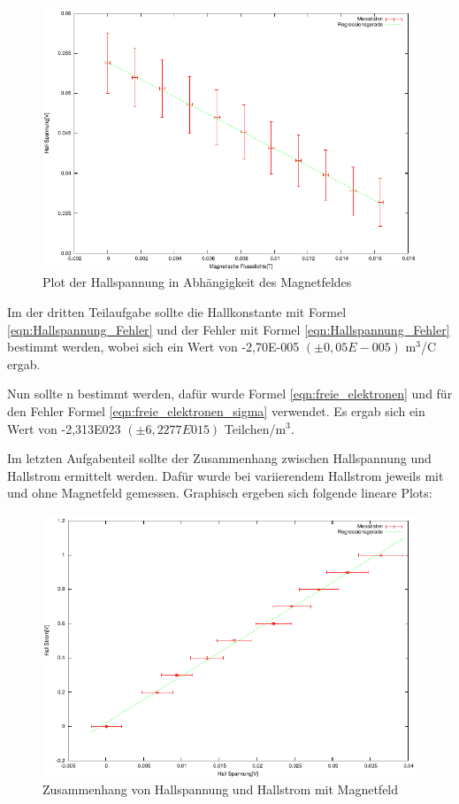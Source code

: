 \documentclass[12pt]{scrartcl}
\begin{document}
\begin{figure}[htbp] 
  \centering
    \includegraphics[scale = 1.3]{aufgabe_3_b.pdf}
  	\caption[Plot der Hallspannung in Abhängigkeit des Magnetfeldes]{Plot der Hallspannung in Abhängigkeit des Magnetfeldes}
  \label{fig:hall_mag}
\end{figure}

Im der dritten Teilaufgabe sollte die Hallkonstante mit Formel \ref{eqn:Hallspannung_Fehler} und der Fehler mit Formel \ref{eqn:Hallspannung_Fehler} bestimmt werden, wobei sich ein Wert von -2,70E-005 $(\pm 0,05E-005)$ m$^3$/C ergab.

Nun sollte n bestimmt werden, dafür wurde Formel \ref{eqn:freie_elektronen} und für den Fehler Formel \ref{eqn:freie_elektronen_sigma} verwendet. Es ergab sich ein Wert von -2,313E023 $(\pm 6,2277E015)$ Teilchen/m$^3$.

Im letzten Aufgabenteil sollte der Zusammenhang zwischen Hallspannung und Hallstrom ermittelt werden. Dafür wurde bei variierendem Hallstrom jeweils mit und ohne Magnetfeld gemessen.
Graphisch ergeben sich folgende lineare Plots:

\begin{figure}[htbp] 
  \centering
    \includegraphics[scale = 1.3]{aufgabe_3_e_m.pdf}
  	\caption[Zusammenhang von Hallspannung und Hallstrom mit Magnetfeld]{Zusammenhang von Hallspannung und Hallstrom mit Magnetfeld}
  \label{fig:kasten}
\end{figure}
\end{document}
